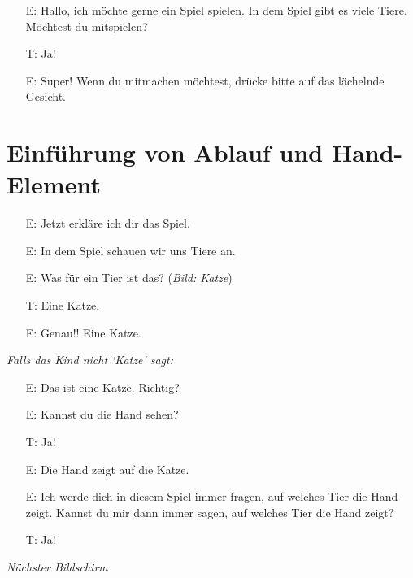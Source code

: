 \documentclass[11pt, oneside]{article}   	%
\begin{document}
\begin{itemize}
\item [E:]  Hallo, ich m\"ochte gerne ein Spiel spielen. In dem Spiel gibt es viele Tiere. M\"ochtest du mitspielen?
\item [T:]  Ja!
\item [E:]  Super! Wenn du mitmachen m\"ochtest, dr\"ucke bitte auf das l\"achelnde Gesicht.
\end{itemize}


\section{Einf\"uhrung von Ablauf und Hand-Element}

\begin{itemize}
\item [E:] Jetzt erkl\"are ich dir das Spiel.
\item [E:] In dem Spiel schauen wir uns Tiere an.
\item [E:] Was f\"ur ein Tier ist das? ({\it Bild: Katze})
\item [T:] Eine Katze.
\item [E:] Genau!! Eine Katze.
\end{itemize}

{\it Falls das Kind nicht `Katze' sagt:}

\begin{itemize}
\item [E:] Das ist eine Katze. Richtig?
\end{itemize}


\begin{itemize}
\item [E:] Kannst du die Hand sehen?
\item [T:] Ja!
\item [E:] Die Hand zeigt auf die Katze.
\item [E:] Ich werde dich in diesem Spiel immer fragen, auf welches Tier die Hand zeigt. Kannst du mir dann immer sagen, auf welches Tier die Hand zeigt?
\item [T:] Ja!
\end{itemize}

{\it N\"achster Bildschirm}
\end{document}
